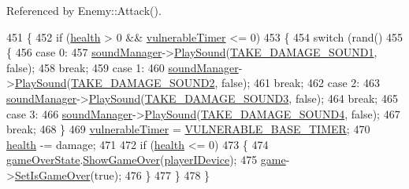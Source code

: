 Referenced by Enemy\-::\-Attack().


\begin{DoxyCode}
451 \{
452     \textcolor{keywordflow}{if} (\hyperlink{_player_8cpp_ae436015bd00ce552ac0bc6eefe3b8e00}{health} > 0 && \hyperlink{_player_8cpp_a73659202e903d625e27de1f6278ead6f}{vulnerableTimer} <= 0)
453     \{
454         \textcolor{keywordflow}{switch} (rand() %
455         \{
456         \textcolor{keywordflow}{case} 0:
457             \hyperlink{_player_8cpp_aa536d458e5b766e20ac204a4ab09cc36}{soundManager}->\hyperlink{class_sound_manager_a81e8f88fe549f6767d3552f12c28ecbc}{PlaySound}(\hyperlink{_player_8cpp_ac5d072b0acab9406d2c98c1779ea117f}{TAKE\_DAMAGE\_SOUND1}, \textcolor{keyword}{false});
458             \textcolor{keywordflow}{break};
459         \textcolor{keywordflow}{case} 1:
460             \hyperlink{_player_8cpp_aa536d458e5b766e20ac204a4ab09cc36}{soundManager}->\hyperlink{class_sound_manager_a81e8f88fe549f6767d3552f12c28ecbc}{PlaySound}(\hyperlink{_player_8cpp_a29b36850eddf785ec49af30087ad662a}{TAKE\_DAMAGE\_SOUND2}, \textcolor{keyword}{false});
461             \textcolor{keywordflow}{break};
462         \textcolor{keywordflow}{case} 2:
463             \hyperlink{_player_8cpp_aa536d458e5b766e20ac204a4ab09cc36}{soundManager}->\hyperlink{class_sound_manager_a81e8f88fe549f6767d3552f12c28ecbc}{PlaySound}(\hyperlink{_player_8cpp_ae0ff94bd607ae4bcc575ca8470301873}{TAKE\_DAMAGE\_SOUND3}, \textcolor{keyword}{false});
464             \textcolor{keywordflow}{break};
465         \textcolor{keywordflow}{case} 3:
466             \hyperlink{_player_8cpp_aa536d458e5b766e20ac204a4ab09cc36}{soundManager}->\hyperlink{class_sound_manager_a81e8f88fe549f6767d3552f12c28ecbc}{PlaySound}(\hyperlink{_player_8cpp_ae04e78447ab78775ae4a7ae88deb8b78}{TAKE\_DAMAGE\_SOUND4}, \textcolor{keyword}{false});
467             \textcolor{keywordflow}{break};
468         \}
469         \hyperlink{_player_8cpp_a73659202e903d625e27de1f6278ead6f}{vulnerableTimer} = \hyperlink{_player_8cpp_a3b89c5e6b6e4acece886a4065679465c}{VULNERABLE\_BASE\_TIMER};
470         \hyperlink{_player_8cpp_ae436015bd00ce552ac0bc6eefe3b8e00}{health} -= damage;
471 
472         \textcolor{keywordflow}{if} (\hyperlink{_player_8cpp_ae436015bd00ce552ac0bc6eefe3b8e00}{health} <= 0)
473         \{
474             \hyperlink{_player_8cpp_a76232c769b4e1ad0ce7399a10191a8d6}{gameOverState}.\hyperlink{class_game_over_state_a144dcad5d29cee7c76be7194407044d6}{ShowGameOver}(\hyperlink{_player_8cpp_acc0d822bdc6a1983133abc5ba4fceecb}{playerIDevice});
475             \hyperlink{_player_8cpp_a58bdb5643d0814ac4e697a1564b79b70}{game}->\hyperlink{class_game_acd4aa68f7ef7603ecd61a879fe0286e7}{SetIsGameOver}(\textcolor{keyword}{true});
476         \}
477     \}
478 \}
\end{DoxyCode}


